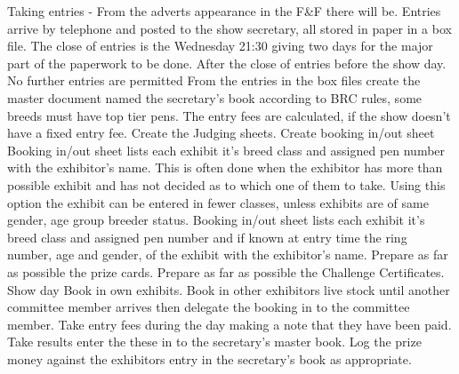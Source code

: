 \documentclass[a4paper,11pt]{report}
\begin{document}
Taking entries - From the adverts appearance in the F\&F there will be.\newline
Entries arrive by telephone and posted to the show secretary, all stored in paper in a box file.\newline
The close of entries is the Wednesday 21:30 giving two days for the major part of the paperwork to be done.\newline \newline
After the close of entries before the show day.\newline
No further entries are permitted\newline
From the entries in the box files create the master document named the secretary’s book according to BRC rules, some breeds must have top tier pens. \newline 
The entry fees are calculated, if the show doesn't have a fixed entry fee.\newline 
Create the Judging sheets.\newline
Create booking in/out sheet\newline
Booking in/out sheet lists each exhibit it's breed class and assigned pen number with the exhibitor's name. This is often done when the exhibitor has more than possible exhibit and has not decided as to which one of them to take. Using this option the exhibit can be entered in fewer classes, unless exhibits are of same gender, age group breeder status.\newline   
Booking in/out sheet lists each exhibit it's breed class and assigned pen number and if known at entry time the ring number, age and gender, of the exhibit with the exhibitor's name.\newline
Prepare as far as possible the prize cards.\newline 
Prepare as far as possible the Challenge Certificates.\newline\newline 
Show day\newline
Book in own exhibits.\newline
Book in other exhibitors live stock until another committee member arrives then delegate the booking in to the committee member.\newline
Take entry fees during the day making a note that they have been paid.\newline
Take results  enter the these in to the secretary's master book.\newline
Log the prize money against the exhibitors entry in the secretary's book as appropriate.\newline
\end{document}
